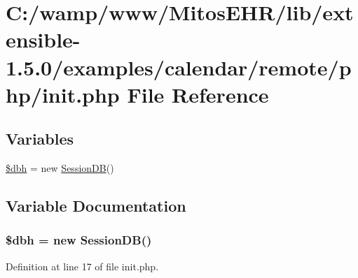 \hypertarget{init_8php}{\section{\-C\-:/wamp/www/\-Mitos\-E\-H\-R/lib/extensible-\/1.5.0/examples/calendar/remote/php/init.php \-File \-Reference}
\label{init_8php}
}
\subsection*{\-Variables}
\begin{DoxyCompactItemize}
\item 
\hyperlink{init_8php_acc1e62674bb7200ea73767c19dc1344d}{\$dbh} = new \hyperlink{class_session_d_b}{\-Session\-D\-B}()
\end{DoxyCompactItemize}


\subsection{\-Variable \-Documentation}
\hypertarget{init_8php_acc1e62674bb7200ea73767c19dc1344d}{
\subsubsection[{\$dbh}]{\setlength{\rightskip}{0pt plus 5cm}\$dbh = new {\bf \-Session\-D\-B}()}}\label{init_8php_acc1e62674bb7200ea73767c19dc1344d}


\-Definition at line 17 of file init.\-php.

